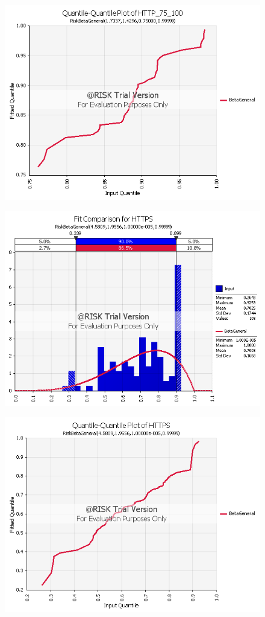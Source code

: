 \documentclass{article}
\begin{document}
\begin{figure}[htbp]
\includegraphics[scale=0.70]{HTTP_75_100_Beta_QQ.png}
\centering
\end{figure}
\begin{figure}[htbp]
\includegraphics[scale=0.70]{HTTPS_Beta_Graph.png}
\centering
\end{figure}
\begin{figure}[htbp]
\includegraphics[scale=0.70]{HTTPS_Beta_QQ.png}
\centering
\end{figure}
\end{document}
